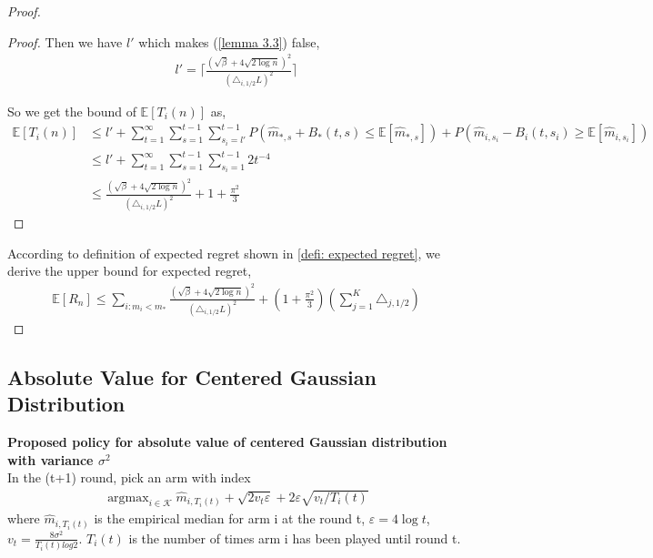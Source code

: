 \documentclass{article}
\DeclareMathOperator*{\argmax}{argmax}
\theoremstyle{plain}
\begin{document}
\begin{proof}
\begin{proof}
    Then we have $l'$ which makes (\ref{lemma 3.3}) false,
   \begin{align}
       l' = \lceil \frac{(\sqrt{\beta} + 4\sqrt{2\log n})^2}{ (\triangle_{i, 1/2} L)^2}  \rceil %
   \end{align}

    So we get the bound of $\mathbb{E}[T_i(n)]$ as,
    \begin{align}
        \mathbb{E}[T_i(n)] &\leq l' + \sum_{t = 1}^\infty \sum_{s = 1}^{t-1} \sum_{s_i = l'}^{t-1} P(\hat{m}_{*, s} + B_*(t, s) \leq  \mathbb{E}[\hat{m}_{*, s}]) + P(\hat{m}_{i, s_i} - B_i(t, s_i) \geq \mathbb{E}[\hat{m}_{i, s_i}])\\
        & \leq l' + \sum_{t = 1}^\infty \sum_{s = 1}^{t-1} \sum_{s_i = 1}^{t-1} 2 t^{-4}\\
        & \leq \frac{(\sqrt{\beta} + 4\sqrt{2\log n})^2}{ (\triangle_{i, 1/2} L)^2}  + 1 + \frac{\pi^2}{3}
    \end{align}

\end{proof}

According to definition of expected regret shown in \ref{defi: expected regret}, we derive the upper bound for expected regret,
\begin{align}
    \mathbb{E}[R_n] \leq
          \sum_{i: m_i < m_\ast}\frac{(\sqrt{\beta} + 4\sqrt{2\log n})^2}{ (\triangle_{i, 1/2} L)^2}  + (1 + \frac{\pi^2}{3}) (\sum_{j=1}^K \triangle_{j, 1/2})
\end{align}
\end{proof}

\subsection{Absolute Value for Centered Gaussian Distribution}

\textbf{Proposed policy for absolute value of centered Gaussian distribution with variance $\sigma^2$}\\
In the (t+1) round, pick an arm with index
\begin{align}
    \label{policy normal}
   \argmax_{i \in \mathcal{K}} \hat{m}_{i, T_i(t)} + \sqrt{2v_t \varepsilon} + 2 \varepsilon \sqrt{v_t/T_i(t)}
\end{align}
where $\hat{m}_{i, T_i(t)}$ is the empirical median for arm i at the round t, $\varepsilon = 4 \log t$, $v_t = \frac{8 \sigma^2}{T_i(t) log2}$. $T_i(t)$ is the number of times arm i has been played until round t.
\end{document}
